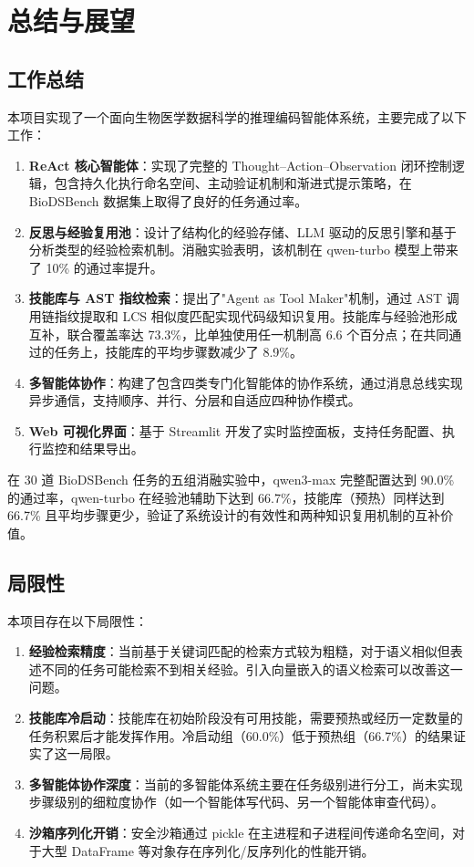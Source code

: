 \section{总结与展望}

\subsection{工作总结}

本项目实现了一个面向生物医学数据科学的推理编码智能体系统，主要完成了以下工作：

\begin{enumerate}
    \item \textbf{ReAct 核心智能体}：实现了完整的 Thought--Action--Observation 闭环控制逻辑，包含持久化执行命名空间、主动验证机制和渐进式提示策略，在 BioDSBench 数据集上取得了良好的任务通过率。
    \item \textbf{反思与经验复用池}：设计了结构化的经验存储、LLM 驱动的反思引擎和基于分析类型的经验检索机制。消融实验表明，该机制在 qwen-turbo 模型上带来了 10\% 的通过率提升。
    \item \textbf{技能库与 AST 指纹检索}：提出了"Agent as Tool Maker"机制，通过 AST 调用链指纹提取和 LCS 相似度匹配实现代码级知识复用。技能库与经验池形成互补，联合覆盖率达 73.3\%，比单独使用任一机制高 6.6 个百分点；在共同通过的任务上，技能库的平均步骤数减少了 8.9\%。
    \item \textbf{多智能体协作}：构建了包含四类专门化智能体的协作系统，通过消息总线实现异步通信，支持顺序、并行、分层和自适应四种协作模式。
    \item \textbf{Web 可视化界面}：基于 Streamlit 开发了实时监控面板，支持任务配置、执行监控和结果导出。
\end{enumerate}

在 30 道 BioDSBench 任务的五组消融实验中，qwen3-max 完整配置达到 90.0\% 的通过率，qwen-turbo 在经验池辅助下达到 66.7\%，技能库（预热）同样达到 66.7\% 且平均步骤更少，验证了系统设计的有效性和两种知识复用机制的互补价值。

\subsection{局限性}

本项目存在以下局限性：

\begin{enumerate}
    \item \textbf{经验检索精度}：当前基于关键词匹配的检索方式较为粗糙，对于语义相似但表述不同的任务可能检索不到相关经验。引入向量嵌入的语义检索可以改善这一问题。
    \item \textbf{技能库冷启动}：技能库在初始阶段没有可用技能，需要预热或经历一定数量的任务积累后才能发挥作用。冷启动组（60.0\%）低于预热组（66.7\%）的结果证实了这一局限。
    \item \textbf{多智能体协作深度}：当前的多智能体系统主要在任务级别进行分工，尚未实现步骤级别的细粒度协作（如一个智能体写代码、另一个智能体审查代码）。
    \item \textbf{沙箱序列化开销}：安全沙箱通过 pickle 在主进程和子进程间传递命名空间，对于大型 DataFrame 等对象存在序列化/反序列化的性能开销。
\end{enumerate}

